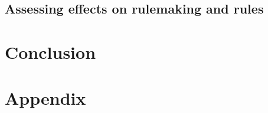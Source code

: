 \documentclass{article}
\begin{document}
\subsection{Assessing effects on rulemaking and rules} \label{influence-methods}













% 



\section{Conclusion}


\newpage
\section{Appendix}
\end{document}
